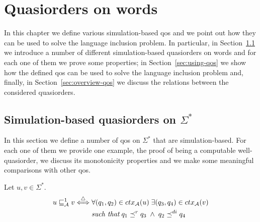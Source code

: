 \chapter{Quasiorders on words}
\label{chap:qos}

In this chapter we define various simulation-based qos and we point out how
they can be used to solve the language inclusion problem.
In particular, in Section~\ref{sec:new-qos} we introduce a number of different simulation-based
quasiorders on words and for each one of them we prove some properties;
in Section~\ref{sec:using-qos} we show how the defined qos can be used to
solve the language inclusion problem and, finally,
in Section~\ref{sec:overview-qos} we discuss the relations between
the considered quasiorders.

\section{Simulation-based quasiorders on $\Sigma^*$}
\label{sec:new-qos}

In this section we define a number of qos on $\Sigma^*$ that are simulation-based.
For each one of them we provide one example, the proof of being a computable
well-quasiorder, we discuss its monotonicity properties and we
make some meaningful comparisons with other qos.

\begin{definition}
\label{defn:wsdir}
Let $u,v \in \Sigma^*$.
\begin{equation*}
\begin{split}
u \sqsubseteq^1_{\mathcal{A}} v \overset{\triangle}{\Longleftrightarrow}
& \; \forall (q_1, q_2) \in ctx_{\mathcal{A}}(u) \;\exists (q_3,q_4) \in ctx_{\mathcal{A}}(v) \\
& \; \textrm{\emph{such that}}\: q_1 \preceq^r q_3 \;\wedge\; q_2 \preceq^{di} q_4
\end{split}
\end{equation*}
\end{definition}


